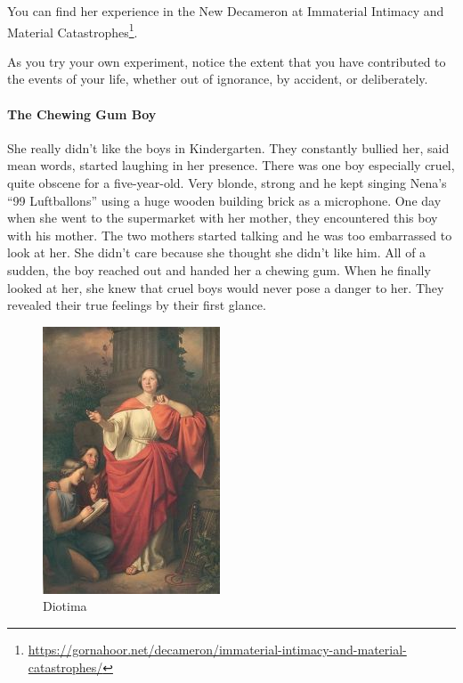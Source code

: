 You can find her experience in the New Decameron at Immaterial Intimacy and Material Catastrophes\footnote{\url{https://gornahoor.net/decameron/immaterial-intimacy-and-material-catastrophes/}}.

As you try your own experiment, notice the extent that you have contributed to the events of your life, whether out of ignorance, by accident, or deliberately.


\hfill

\paragraph{The Chewing Gum Boy}

She really didn't like the boys in Kindergarten. They constantly bullied her, said mean words, started laughing in her presence. There was one boy especially cruel, quite obscene for a five-year-old. Very blonde, strong and he kept singing Nena's “99 Luftballons” using a huge wooden building brick as a microphone. One day when she went to the supermarket with her mother, they encountered this boy with his mother. The two mothers started talking and he was too embarrassed to look at her. She didn't care because she thought she didn't like him. All of a sudden, the boy reached out and handed her a chewing gum. When he finally looked at her, she knew that cruel boys would never pose a danger to her. They revealed their true feelings by their first glance.

\begin{figure}
\includegraphics[scale=.5]{a20210215ImmaterialIntimacy-img001.jpg} 
\caption{Diotima}
\end{figure}


